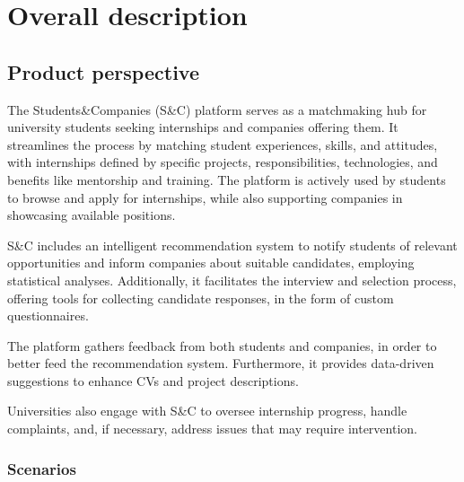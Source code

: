 \chapter{Overall description}

\section{Product perspective}

The Students\&Companies (S\&C) platform serves as a matchmaking hub for university students seeking internships and companies offering them.
It streamlines the process by matching student experiences, skills, and attitudes, with internships defined by specific projects, responsibilities, technologies, and benefits like mentorship and training.
The platform is actively used by students to browse and apply for internships, while also supporting companies in showcasing available positions.

S\&C includes an intelligent recommendation system to notify students of relevant opportunities and inform companies about suitable candidates, employing statistical analyses.
Additionally, it facilitates the interview and selection process, offering tools for collecting candidate responses, in the form of custom questionnaires.

The platform gathers feedback from both students and companies, in order to better feed the recommendation system.
Furthermore, it provides data-driven suggestions to enhance CVs and project descriptions.

Universities also engage with S\&C to oversee internship progress, handle complaints, and, if necessary, address issues that may require intervention.

\subsection{Scenarios}

